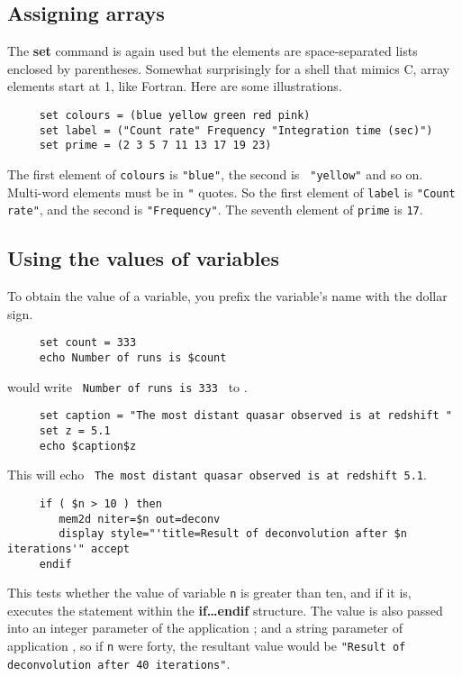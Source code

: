 \subsection{Assigning arrays
\label{sc4-se:assign_array}}

The {\bf set} command is again used but the elements are space-separated
lists enclosed by parentheses.  Somewhat surprisingly for a shell that
mimics C, array elements start at 1, like Fortran.
Here are some illustrations.

\small
\begin{verbatim}
     set colours = (blue yellow green red pink)
     set label = ("Count rate" Frequency "Integration time (sec)")
     set prime = (2 3 5 7 11 13 17 19 23)
\end{verbatim}
\normalsize
The first element of {\tt colours} is {\tt "blue"}, the second is {\tt
"yellow"} and so on.  Multi-word elements must be in {\tt "} quotes.  So
the first element of {\tt label} is {\tt "Count rate"}, and the second
is {\tt "Frequency"}.  The seventh element of {\tt prime} is {\tt 17}.

\subsection{Using the values of variables
\label{sc4_se_values}}

To obtain the value of a variable, you prefix the variable's name with
the dollar sign.

\small
\begin{verbatim}
     set count = 333
     echo Number of runs is $count
\end{verbatim}
\normalsize
would write ~{\tt Number of runs is 333}~ to .

\small
\begin{verbatim}
     set caption = "The most distant quasar observed is at redshift "
     set z = 5.1
     echo $caption$z
\end{verbatim}
\normalsize
This will echo ~{\tt The most distant quasar observed is at redshift 5.1}.

\small
\begin{verbatim}
     if ( $n > 10 ) then
        mem2d niter=$n out=deconv
        display style="'title=Result of deconvolution after $n iterations'" accept
     endif
\end{verbatim}
\normalsize
This tests whether the value of variable {\tt n} is greater than ten, and
if it is, executes the statement within the {\bf if\ldots endif}
structure.  The value is also passed into an integer parameter of the
application ; and a string parameter of application 
, so if {\tt n} were forty, the resultant value would
be {\tt "Result of deconvolution after 40 iterations"}.

